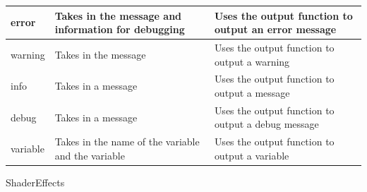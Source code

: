 \documentclass{article}
\begin{document}
\begin{center}
\begin{tabular}{ | m{} | m{}| m{} | }
                        \hline
                        error & Takes in the message and information for debugging & Uses the output function to output an error message \\
                        \hline
                        warning & Takes in the message & Uses the output function to output a warning \\
                        \hline
                        info & Takes in a message & Uses the output function to output a message \\
                        \hline
                        debug & Takes in a message & Uses the output function to output a debug message \\
                        \hline
                        variable & Takes in the name of the variable and the variable & Uses the output function to output a variable \\
                        \hline
                    \end{tabular}
                \end{center}
                ShaderEffects
\end{document}
